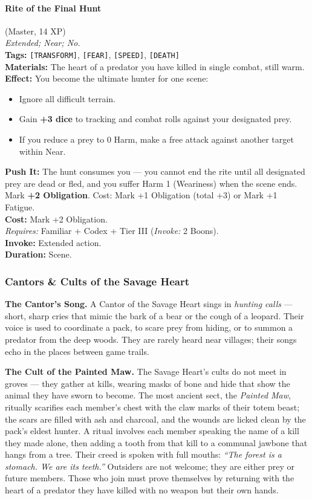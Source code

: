 \paragraph{Rite of the Final Hunt} (Master, 14 XP) \hfill \\
\emph{Extended; Near; No.} \\
\textbf{Tags:} \texttt{[TRANSFORM]}, \texttt{[FEAR]}, \texttt{[SPEED]}, \texttt{[DEATH]} \\
\textbf{Materials:} The heart of a predator you have killed in single combat, still warm. \\
\textbf{Effect:} You become the ultimate hunter for one scene:
\begin{itemize}
  \item Ignore all difficult terrain.
  \item Gain \textbf{+3 dice} to tracking and combat rolls against your designated prey.
  \item If you reduce a prey to 0 Harm, make a free attack against another target within Near.
\end{itemize}
\textbf{Push It:} The hunt consumes you --- you cannot end the rite until all designated prey are dead or fled, and you suffer Harm 1 (Weariness) when the scene ends. Mark \textbf{+2 Obligation}. Cost: Mark +1 Obligation (total +3) or Mark +1 Fatigue. \\
\textbf{Cost:} Mark +2 Obligation. \\
\textit{Requires:} Familiar + Codex + Tier III (\textit{Invoke:} 2 Boons). \\
\textbf{Invoke:} Extended action. \\
\textbf{Duration:} Scene.

\subsubsection*{Cantors \& Cults of the Savage Heart}

\textbf{The Cantor's Song.} A Cantor of the Savage Heart sings in \textit{hunting calls} --- short, sharp cries that mimic the bark of a bear or the cough of a leopard. Their voice is used to coordinate a pack, to scare prey from hiding, or to summon a predator from the deep woods. They are rarely heard near villages; their songs echo in the places between game trails.

\textbf{The Cult of the Painted Maw.} The Savage Heart's cults do not meet in groves --- they gather at kills, wearing masks of bone and hide that show the animal they have sworn to become. The most ancient sect, the \textit{Painted Maw}, ritually scarifies each member's chest with the claw marks of their totem beast; the scars are filled with ash and charcoal, and the wounds are licked clean by the pack's eldest hunter. A ritual involves each member speaking the name of a kill they made alone, then adding a tooth from that kill to a communal jawbone that hangs from a tree. Their creed is spoken with full mouths: \textit{``The forest is a stomach. We are its teeth.''} Outsiders are not welcome; they are either prey or future members. Those who join must prove themselves by returning with the heart of a predator they have killed with no weapon but their own hands.

